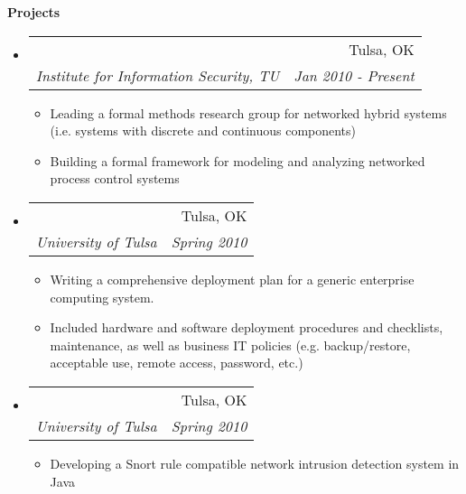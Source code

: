 \documentclass[letterpaper,11pt]{article}
\makeatletter
\newcommand{\resitem}[1]{\item #1 \vspace{-2pt}}
\newcommand{\resheading}[1]{{\large \colorbox{mygrey}{\begin{minipage}{\textwidth}{\textbf{#1 \vphantom{p\^{E}}}}\end{minipage}}}}
\newcommand{\ressubheading}[4]{
\begin{tabular*}{6.5in}{l@{\extracolsep{\fill}}r}
		\textbf{\parbox{5in}{\raggedright #1 }} & #2 \\
		\textit{#3} & \textit{#4} \\
\end{tabular*}\vspace{-6pt}}
\makeatother
\begin{document}
\resheading{Projects}
\begin{itemize}
\item
	\ressubheading{Cyber-physical Systems}{Tulsa, OK}{Institute for Information Security, TU}{Jan 2010 - Present}
	\begin{itemize}
		\resitem{Leading a formal methods research group for networked hybrid systems (i.e. systems with discrete and continuous components)}
		\resitem{Building a formal framework for modeling and analyzing networked process control systems}
	\end{itemize}

\item
	\ressubheading{Deployment Plan}{Tulsa, OK}{University of Tulsa}{Spring 2010}
	\begin{itemize}
		\resitem{Writing a comprehensive deployment plan for a generic enterprise computing system.}
		\resitem{Included hardware and software deployment procedures and checklists, maintenance, as well as business IT policies (e.g. backup/restore, acceptable use, remote access, password, etc.)}
	\end{itemize}

\item
	\ressubheading{Intrusion Detection System}{Tulsa, OK}{University of Tulsa}{Spring 2010}
	\begin{itemize}
		\resitem{Developing a Snort rule compatible network intrusion detection system in Java}
	\end{itemize}


\end{itemize}
\end{document}
